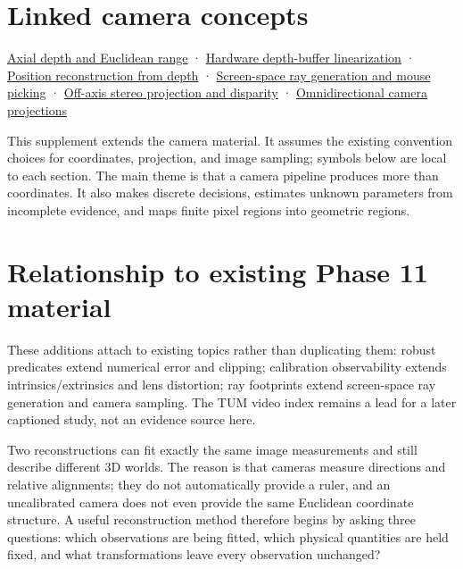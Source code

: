\section{Linked camera concepts}\label{02-foundations-ii-ch039-linked-camera-concepts}

\hyperref[02-foundations-ii-ch035-recover-geometry-from-depth-and-construct-screen-space-rays]{Axial depth and Euclidean range} · \hyperref[02-foundations-ii-ch035-recover-geometry-from-depth-and-construct-screen-space-rays]{Hardware depth-buffer linearization} · \hyperref[02-foundations-ii-ch035-recover-geometry-from-depth-and-construct-screen-space-rays]{Position reconstruction from depth} · \hyperref[02-foundations-ii-ch035-recover-geometry-from-depth-and-construct-screen-space-rays]{Screen-space ray generation and mouse picking} · \hyperref[02-foundations-ii-ch035-build-projection-and-stereo-geometry-around-real-camera-baselines]{Off-axis stereo projection and disparity} · \hyperref[02-foundations-ii-ch035-represent-directions-over-the-full-sphere]{Omnidirectional camera projections}

This supplement extends the camera material. It assumes the existing convention choices for coordinates, projection, and image sampling; symbols below are local to each section. The main theme is that a camera pipeline produces more than coordinates. It also makes discrete decisions, estimates unknown parameters from incomplete evidence, and maps finite pixel regions into geometric regions.

\section{Relationship to existing Phase 11 material}\label{02-foundations-ii-ch039-relationship-to-existing-phase-11-material}

These additions attach to existing topics rather than duplicating them: robust predicates extend numerical error and clipping; calibration observability extends intrinsics/extrinsics and lens distortion; ray footprints extend screen-space ray generation and camera sampling. The TUM video index remains a lead for a later captioned study, not an evidence source here.

Two reconstructions can fit exactly the same image measurements and still describe different 3D worlds. The reason is that cameras measure directions and relative alignments; they do not automatically provide a ruler, and an uncalibrated camera does not even provide the same Euclidean coordinate structure. A useful reconstruction method therefore begins by asking three questions: which observations are being fitted, which physical quantities are held fixed, and what transformations leave every observation unchanged?

